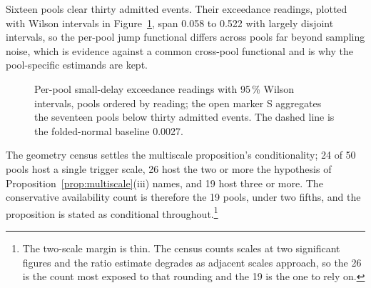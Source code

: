\documentclass[11pt,a4paper]{article}
\theoremstyle{definition}
\theoremstyle{plain}
\theoremstyle{remark}
\begin{document}
Sixteen pools clear thirty admitted events. Their exceedance readings, plotted with Wilson intervals in Figure~\ref{fig:perpool}, span 0.058 to 0.522 with largely 
disjoint intervals, so the per-pool jump functional differs across pools far beyond sampling noise, which is evidence against a common cross-pool functional and is 
why the pool-specific estimands are kept.

\begin{figure}[H]
\centering
{}
\caption{Per-pool small-delay exceedance readings with 95\,\%
Wilson intervals, pools ordered by reading; the open marker S
aggregates the seventeen pools below thirty admitted events. The
dashed line is the folded-normal baseline 0.0027.}
\label{fig:perpool}
\end{figure} The geometry census settles the multiscale proposition's conditionality; 24 of 50 pools host a single trigger scale, 26 host the two or more the
hypothesis of Proposition~\ref{prop:multiscale}(iii) names, and 19 host three or more. The conservative availability count is therefore the 19 pools, under two fifths, and the proposition is stated as
conditional throughout.\footnote{The two-scale margin is thin. The census counts scales at two significant figures and the ratio estimate degrades as adjacent scales approach, so the 26 is the count
most exposed to that rounding and the 19 is the one to rely on.}
\end{document}
